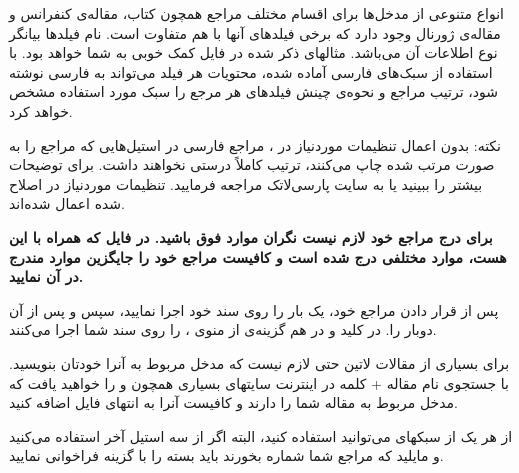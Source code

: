 انواع متنوعی از مدخل‌ها برای اقسام مختلف مراجع همچون کتاب، مقاله‌ی کنفرانس و مقاله‌ی ژورنال وجود دارد که برخی فیلدهای آنها با هم متفاوت است. 
نام فیلدها بیانگر نوع اطلاعات آن می‌باشد. مثالهای ذکر شده در فایل  کمک خوبی به شما خواهد بود. 
با استفاده از سبک‌های فارسی آماده شده، محتویات هر فیلد می‌تواند به فارسی نوشته شود، ترتیب مراجع و نحوه‌ی چینش فیلدهای هر مرجع را سبک مورد استفاده  مشخص خواهد کرد.

نکته: بدون اعمال تنظیمات موردنیاز  در ، مراجع فارسی در استیل‌هایی که مراجع را به صورت مرتب شده چاپ می‌کنند، ترتیب کاملاً درستی نخواهند داشت. برای توضیحات بیشتر \cite{persianbib87userguide} را ببینید یا به سایت پارسی‌لاتک مراجعه فرمایید. تنظیمات موردنیاز در  اصلاح شده اعمال شده‌اند.

\textbf{برای درج مراجع خود لازم نیست نگران موارد فوق باشید. در فایل 
 که همراه با این \پ هست، موارد مختلفی درج شده است و کافیست مراجع خود را جایگزین موارد مندرج در آن نمایید.
}

پس از قرار دادن مراجع خود، یک بار  را روی سند خود اجرا نمایید، سپس  و پس از آن دوبار  را. در  کلید  و در  هم گزینه‌ی  از منوی ،  را روی سند شما اجرا می‌کنند.

برای بسیاری از مقالات لاتین حتی لازم نیست که مدخل مربوط به آنرا خودتان بنویسید. با جستجوی نام مقاله + کلمه   در اینترنت سایتهای بسیاری همچون  و  را خواهید یافت که مدخل  مربوط به مقاله شما را دارند و کافیست آنرا به انتهای فایل  اضافه کنید.

از هر یک از سبکهای  می‌توانید استفاده کنید، البته اگر از سه استیل آخر استفاده می‌کنید و مایلید که مراجع شما شماره بخورند باید بسته  را با گزینه  فراخوانی نمایید.
